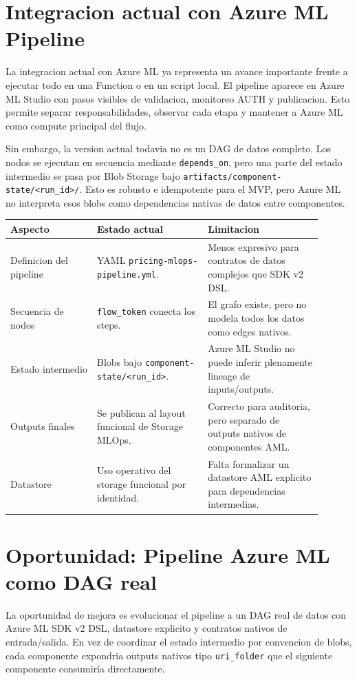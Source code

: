 \documentclass[11pt,letterpaper]{article}
\newcommand{\code}[1]{\texttt{\small #1}}
\begin{document}
\section*{Integracion actual con Azure ML Pipeline}

La integracion actual con Azure ML ya representa un avance importante frente a ejecutar todo en una Function o en un script local. El pipeline aparece en Azure ML Studio con pasos visibles de validacion, monitoreo AUTH y publicacion. Esto permite separar responsabilidades, observar cada etapa y mantener a Azure ML como compute principal del flujo.

Sin embargo, la version actual todavia no es un DAG de datos completo. Los nodos se ejecutan en secuencia mediante \code{depends\_on}, pero una parte del estado intermedio se pasa por Blob Storage bajo \code{artifacts/component-state/<run\_id>/}. Esto es robusto e idempotente para el MVP, pero Azure ML no interpreta esos blobs como dependencias nativas de datos entre componentes.

\begin{longtable}{p{0.25\linewidth}p{0.32\linewidth}p{0.33\linewidth}}
\toprule
\textbf{Aspecto} & \textbf{Estado actual} & \textbf{Limitacion}\\
\midrule
\endhead
Definicion del pipeline & YAML \code{pricing-mlops-pipeline.yml}. & Menos expresivo para contratos de datos complejos que SDK v2 DSL.\\
Secuencia de nodos & \code{flow\_token} conecta los steps. & El grafo existe, pero no modela todos los datos como edges nativos.\\
Estado intermedio & Blobs bajo \code{component-state/<run\_id>}. & Azure ML Studio no puede inferir plenamente lineage de inputs/outputs.\\
Outputs finales & Se publican al layout funcional de Storage MLOps. & Correcto para auditoria, pero separado de outputs nativos de componentes AML.\\
Datastore & Uso operativo del storage funcional por identidad. & Falta formalizar un datastore AML explicito para dependencias intermedias.\\
\bottomrule
\end{longtable}

\section*{Oportunidad: Pipeline Azure ML como DAG real}

La oportunidad de mejora es evolucionar el pipeline a un DAG real de datos con Azure ML SDK v2 DSL, datastore explicito y contratos nativos de entrada/salida. En vez de coordinar el estado intermedio por convencion de blobs, cada componente expondria outputs nativos tipo \code{uri\_folder} que el siguiente componente consumiría directamente.
\end{document}

